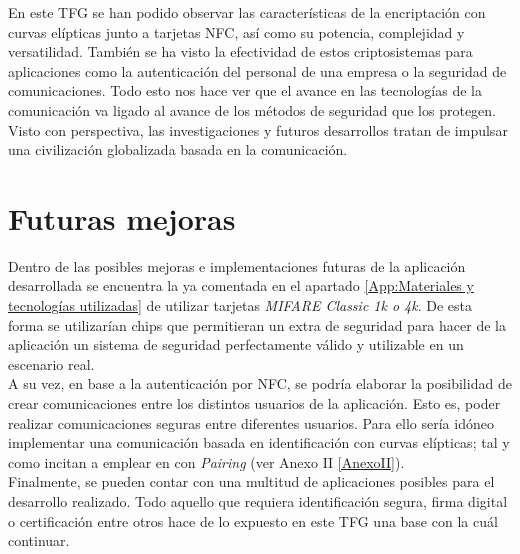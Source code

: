 \documentclass[../PFC.tex]{subfiles}
\begin{document}
En este TFG se han podido observar las características de la encriptación con curvas elípticas junto a tarjetas NFC, así como su potencia, complejidad y versatilidad. También se ha visto la efectividad de estos criptosistemas para aplicaciones como la autenticación del personal de una empresa o la seguridad de comunicaciones. Todo esto nos hace ver que el avance en las tecnologías de la comunicación va ligado al avance de los métodos de seguridad que los protegen. Visto con perspectiva, las investigaciones y futuros desarrollos tratan de impulsar una civilización globalizada basada en la comunicación.

\section{Futuras mejoras}
\label{Futuras mejoras}

Dentro de las posibles mejoras e implementaciones futuras de la aplicación desarrollada se encuentra la ya comentada en el apartado \ref{App:Materiales y tecnologías utilizadas} de utilizar tarjetas \textit{MIFARE Classic 1k o 4k}. De esta forma se utilizarían chips que permitieran un extra de seguridad para hacer de la aplicación un sistema de seguridad perfectamente válido y utilizable en un escenario real.
\*
\vspace{0.5515cm}
\\
A su vez, en base a la autenticación por NFC, se podría elaborar la posibilidad de crear comunicaciones entre los distintos usuarios de la aplicación. Esto es, poder realizar comunicaciones seguras entre diferentes usuarios. Para ello sería idóneo implementar una comunicación basada en identificación con curvas elípticas; tal y como incitan a emplear en\cite{boneh2001identity} con \textit{Pairing}\cite{dupont2006provably} (ver Anexo II \ref{AnexoII}).
\*
\vspace{0.5515cm}
\\
Finalmente, se pueden contar con una multitud de aplicaciones posibles para el desarrollo realizado. Todo aquello que requiera identificación segura, firma digital o certificación entre otros hace de lo expuesto en este TFG una base con la cuál continuar.
\end{document}
